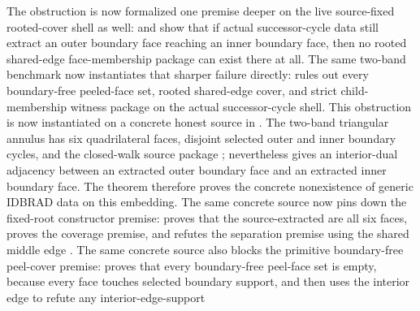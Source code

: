 \documentclass[11pt]{article}
\begin{document}
The obstruction is now formalized one premise deeper on the live source-fixed
rooted-cover shell as well:
and
show that if actual successor-cycle data still extract an outer boundary face
reaching an inner boundary face, then no rooted shared-edge face-membership
package can exist there at all.
The same two-band benchmark now instantiates that sharper failure directly:
rules out every boundary-free peeled-face set, rooted shared-edge cover, and
strict child-membership witness package on the actual successor-cycle shell.
This obstruction is now instantiated on a concrete honest source in
.
The two-band triangular annulus
 has six quadrilateral faces, disjoint selected
outer and inner boundary cycles, and the closed-walk source package
; nevertheless
 gives an interior-dual
adjacency between an extracted outer boundary face and an extracted inner
boundary face.  The theorem
therefore proves the concrete nonexistence of generic IDBRAD data on this
embedding.  The same concrete source now pins down the fixed-root constructor
premise:  proves that the
source-extracted  are all six faces,
 proves the coverage
premise, and 
refutes the separation premise using the shared middle edge .
The same concrete source also blocks the primitive boundary-free peel-cover
premise:  proves that
every boundary-free peel-face set is empty, because every face touches selected
boundary support, and
then uses the interior edge  to refute any interior-edge-support
\end{document}
